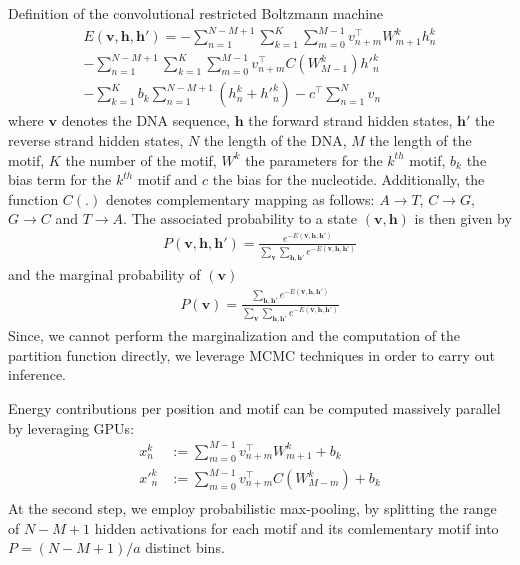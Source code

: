 \documentclass[12pt]{article}
\begin{document}
Definition of the convolutional restricted Boltzmann machine
\begin{align}
	E(\mathbf{v},\mathbf{h}, \mathbf{h}')=
	-\sum_{n=1}^{N-M+1}\sum_{k=1}^K\sum_{m=0}^{M-1} v_{n+m}^\top W_{m+1}^k h_n^k \nonumber\\
	-\sum_{n=1}^{N-M+1}\sum_{k=1}^K\sum_{m=0}^{M-1} v_{n+m}^\top C(W_{M-1}^k) {h'}_n^k\nonumber\\
	- \sum_{k=1}^K b_k \sum_{n=1}^{N-M+1}(h_n^k + {h'}_n^k)
	-c^\top \sum_{n=1}^{N}v_n
\end{align}
where $\mathbf{v}$ denotes the DNA sequence, $\mathbf{h}$ the forward strand 
hidden states, $\mathbf{h}'$ the reverse strand
hidden states, $N$ the length of the DNA, $M$ the length of the motif, 
$K$ the number of the motif, $W^k$ the parameters for the $k^{th}$ motif,
$b_k$ the bias term for the $k^{th}$ motif and $c$ the bias for the
nucleotide. Additionally, the function $C(.)$ denotes complementary mapping
as follows: $A\rightarrow T$, 
$C\rightarrow G$, $G\rightarrow C$ and $T\rightarrow A$.
The associated probability to a state $(\mathbf{v},\mathbf{h})$ is then given
by
\begin{align}
	P(\mathbf{v},\mathbf{h}, \mathbf{h}')=\frac{e^{-E(\mathbf{v},\mathbf{h},\mathbf{h}')}}
	{\sum_{\mathbf{v}}\sum_{\mathbf{h}, \mathbf{h}'}e^{-E(\mathbf{v},\mathbf{h},\mathbf{h}')}}
\end{align}
and the marginal probability of $(\mathbf{v})$
\begin{align}
	P(\mathbf{v})=\frac{\sum_{\mathbf{h}, \mathbf{h}'}e^{-E(\mathbf{v},\mathbf{h},\mathbf{h}')}}
	{\sum_{\mathbf{v}}\sum_{\mathbf{h},\mathbf{h}'}e^{-E(\mathbf{v},\mathbf{h},\mathbf{h}')}}
\end{align}
Since, we cannot perform the marginalization and the computation of the
partition function directly, we leverage MCMC techniques in order
to carry out inference.\par
Energy contributions per position and motif can be computed massively parallel
by leveraging GPUs:
\begin{align}
	x_n^k&:=\sum_{m=0}^{M-1}v_{n+m}^\top W_{m+1}^k + b_k\\
	{x'}_n^k&:=\sum_{m=0}^{M-1}v_{n+m}^\top C(W_{M-m}^k) + b_k\\
\end{align}
At the second step, we employ probabilistic max-pooling, 
by splitting the range of $N-M+1$ hidden activations for
each motif and its comlementary motif into $P=(N-M+1)/a$ distinct bins.
\end{document}
